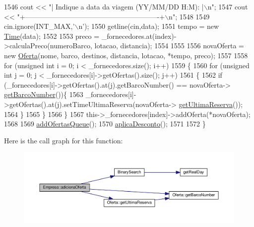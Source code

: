 \begin{DoxyCode}
1546     cout << \textcolor{stringliteral}{"| Indique a data da viagem (YY/MM/DD H:M):                 |\(\backslash\)n"};
1547     cout << \textcolor{stringliteral}{"+----------------------------------------------------------+\(\backslash\)n"};
1548 
1549     cin.ignore(INT\_MAX,\textcolor{charliteral}{'\(\backslash\)n'});
1550     getline(cin,data);
1551     tempo = \textcolor{keyword}{new} \hyperlink{classTime}{Time}(data);
1552 
1553     preco = \_fornecedores.at(index)->calculaPreco(numeroBarco, lotacao, distancia);
1554     
1555     
1556     novaOferta = \textcolor{keyword}{new} \hyperlink{classOferta}{Oferta}(nome, barco, destinos, distancia, lotacao, *tempo, preco);
1557 
1558     \textcolor{keywordflow}{for} (\textcolor{keywordtype}{unsigned} \textcolor{keywordtype}{int} i = 0; i < \_fornecedores.size(); i++)
1559     \{
1560         \textcolor{keywordflow}{for} (\textcolor{keywordtype}{unsigned} \textcolor{keywordtype}{int} j = 0; j < \_fornecedores[i]->getOfertas().size(); j++)
1561         \{
1562             \textcolor{keywordflow}{if} (\_fornecedores[i]->getOfertas().at(j).getBarcoNumber() == novaOferta->
      \hyperlink{classOferta_abf0f062fa730edf6d4232926980b106c}{getBarcoNumber}())\{
1563                 \_fornecedores[i]->getOfertas().at(j).setTimeUltimaReserva(novaOferta->
      \hyperlink{classOferta_a1caf2c681c14c9fbd04312b35f99b64c}{getUltimaReserva}());
1564         \}
1565         \}
1566     \}
1567     this->\_fornecedores[index]->addOferta(*novaOferta);
1568 
1569     \hyperlink{classEmpresa_a5ca8821d938f11f29558ae90913de528}{addOfertasQueue}();
1570     \hyperlink{classEmpresa_a46a4898b8ae8e09bdf656b25b8ffe99d}{aplicaDesconto}();
1571 
1572 \}
\end{DoxyCode}


Here is the call graph for this function\+:\nopagebreak
\begin{figure}[H]
\begin{center}
\leavevmode
\includegraphics[width=350pt]{classEmpresa_ae244a8ae3afb85eb5e9e5febce8b8728_cgraph}
\end{center}
\end{figure}


